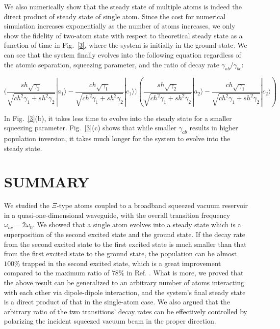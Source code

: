 \documentclass[aps,showpacs,twocolumn,twoside,groupedaddress]{revtex4}
\begin{document}
We also numerically show that the steady state of multiple atoms is indeed the direct product of steady state of single atom. Since the cost for numerical simulation increases exponentially as the number of atoms increases, we only show the fidelity of two-atom state with respect to theoretical steady state as a function of time in Fig.~\ref{3}, where the system is initially in the ground state. We can see that the system finally evolves into the following equation regardless of the atomic separation, squeezing parameter, and the ratio of decay rate $\gamma_{ab}/\gamma_{bc}$: 
\begin{widetext}
\begin{equation}
\ensuremath{(\frac{sh\sqrt{\gamma_{2}}}{\sqrt{ch^{2}\gamma_{1}+sh^{2}\gamma_{2}}}|a_{1}\rangle-\frac{ch\sqrt{\gamma_{1}}}{\sqrt{ch^{2}\gamma_{1}+sh^{2}\gamma_{2}}}|c_{1}\rangle})(\frac{sh\sqrt{\gamma_{2}}}{\sqrt{ch^{2}\gamma_{1}+sh^{2}\gamma_{2}}}|a_{2}\rangle-\frac{ch\sqrt{\gamma_{1}}}{\sqrt{ch^{2}\gamma_{1}+sh^{2}\gamma_{2}}}|c_{2}\rangle)\nonumber
\end{equation}
\end{widetext}
In Fig.~\ref{3}(b), it takes less time to evolve into the steady state for a smaller squeezing parameter. Fig.~\ref{3}(c) shows that while smaller $\gamma_{ab}$ results in higher population inversion, it takes much longer for the system to evolve into the steady state.

\section{SUMMARY}
We studied the $\Xi$-type atoms coupled to a broadband squeezed vacuum reservoir in a quasi-one-dimensional waveguide, with the overall transition frequency $\omega_{ac}=2\omega_0$. We showed that a single atom evolves into a steady state which is a superposition of the second excited state and the ground state. If the decay rate from the second excited state to the first excited state is much smaller than that from the first excited state to the ground state, the population can be almost $100\%$ trapped in the second excited state, which is a great improvement compared to the maximum ratio of $78\%$ in Ref. \cite{ficek1993two}. What is more, we proved that the above result can be generalized to an arbitrary number of atoms interacting with each other via dipole-dipole interaction, and the system's final steady state is a direct product of that in the single-atom case. We also argued that the arbitrary ratio  of the two transitions' decay rates can be effectively controlled by polarizing the incident squeezed vacuum beam in the proper direction. 
\end{document}
